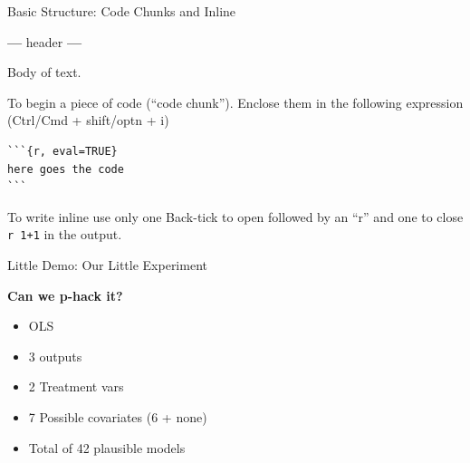 \documentclass[ignorenonframetext,]{beamer}
\newenvironment{Shaded}{\begin{snugshade}}{\end{snugshade}}
\newcommand{\NormalTok}[1]{#1}
\newcommand{\OperatorTok}[1]{\textcolor[rgb]{0.81,0.36,0.00}{\textbf{#1}}}
\providecommand{\tightlist}{%
  \setlength{\itemsep}{0pt}\setlength{\parskip}{0pt}}
\begin{document}
\begin{frame}[fragile]{Basic Structure: Code Chunks and Inline}
\protect\hypertarget{basic-structure-code-chunks-and-inline}{}

\begin{Shaded}
\begin{Highlighting}[]
\OperatorTok{---}
\NormalTok{header}
\OperatorTok{---}
\end{Highlighting}
\end{Shaded}

Body of text.

To begin a piece of code (``code chunk''). Enclose them in the following
expression (Ctrl/Cmd + shift/optn + i)

\begin{verbatim}
```{r, eval=TRUE}
here goes the code
```
\end{verbatim}

To write inline use only one Back-tick to open followed by an ``r'' and
one to close \texttt{\textasciigrave{}r\ 1+1\textasciigrave{}} in the
output.

\end{frame}

\begin{frame}{Little Demo: Our Little Experiment}
\protect\hypertarget{little-demo-our-little-experiment}{}

\textbf{Can we p-hack it?}

\begin{itemize}
\tightlist
\item
  OLS
\item
  3 outputs
\item
  2 Treatment vars\\
\item
  7 Possible covariates (6 + none)\\
\item
  Total of 42 plausible models
\end{itemize}

\end{frame}
\end{document}
